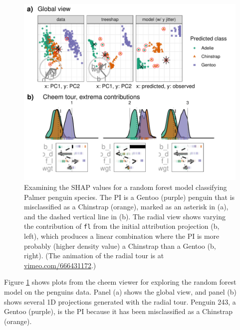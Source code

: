 \documentclass[
]{article}
\begin{document}
\begin{figure}

{\centering \includegraphics[width=1\linewidth]{./figures/case_penguins} 

}

\caption{Examining the SHAP values for a random forest model classifying Palmer penguin species. The PI is a Gentoo (purple) penguin that is misclassified as a Chinstrap (orange), marked as an asterisk in (a), and the dashed vertical line in (b). The radial view shows varying the contribution of \texttt{fl} from the initial attribution projection (b, left), which produces a linear combination where the PI is more probably (higher density value) a Chinstrap than a Gentoo (b, right). (The animation of the radial tour is at \href{https://vimeo.com/666431172}{vimeo.com/666431172}.)}\label{fig:casepenguins}
\end{figure}

Figure \ref{fig:casepenguins} shows plots from the cheem viewer for exploring the random forest model on the penguins data. Panel (a) shows the global view, and panel (b) shows several 1D projections generated with the radial tour. Penguin 243, a Gentoo (purple), is the PI because it has been misclassified as a Chinstrap (orange).
\end{document}
